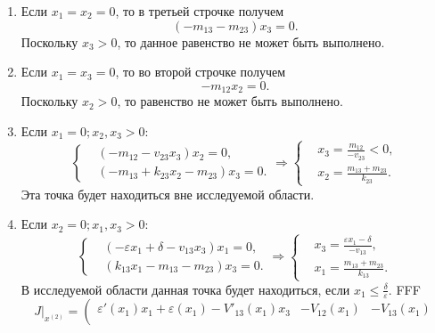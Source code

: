 \begin{enumerate}
\begin{enumerate}
            
        \end{enumerate}


        \item Если \( x_1 = x_2 = 0 \), то в третьей строчке получем
        \[ \left( -m_{13} -m_{23} \right) x_3 = 0. \]
        Поскольку \( x_3 > 0\), то данное равенство не может быть выполнено.


        \item Если \( x_1 = x_3 = 0 \), то во второй строчке получем
        \[ -m_{12} x_2 = 0. \]
        Поскольку \( x_2 > 0 \), то равенство не может быть выполнено.


        \item Если \( x_1 = 0; x_2, x_3 > 0 \):
            \[
                \left\{\begin{split}
                    & \left( -m_{12} - v_{23} x_3 \right) x_2 = 0, \\
                    & \left( -m_{13} + k_{23} x_2 - m_{23} \right) x_3 = 0. 
                \end{split}\right.
                \Rightarrow
                \left\{\begin{split}
                    & x_3 = \frac{ m_{12} }{ -v_{23} } < 0, \\
                    & x_2 = \frac{m_{13} + m_{23}}{k_{23}} . 
                \end{split}\right.
            \]
            Эта точка будет находиться вне исследуемой области.
        \item Если \( x_2 = 0; x_1, x_3 > 0 \):
            \[
                \left\{\begin{split}
                    & \left( -\varepsilon x_1 + \delta - v_{13} x_3 \right)x_1 = 0, \\
                    & \left( k_{13} x_1 -m_{13} - m_{23} \right)x_3 = 0. 
                \end{split}\right.
                \Rightarrow
                \left\{\begin{split}
                    & x_3 = \frac{ \varepsilon x_1 - \delta }{ -v_{13} }, \\
                    & x_1 = \frac{m_{13} + m_{23}}{k_{13}}. 
                \end{split}\right.
            \]
            В исследуемой области данная точка будет находиться, если \( x_1 \leq \frac{\delta}{\varepsilon} \). FFF
            \[
                J \big|_{x^{(2)}} = \left(
                    \begin{matrix}
                        \varepsilon'(x_1) x_1 + \varepsilon(x_1) - V'_{13} (x_1) x_3 & -V_{12} (x_1) & -V_{13} (x_1) \\

\end{matrix}\]
\end{enumerate}
